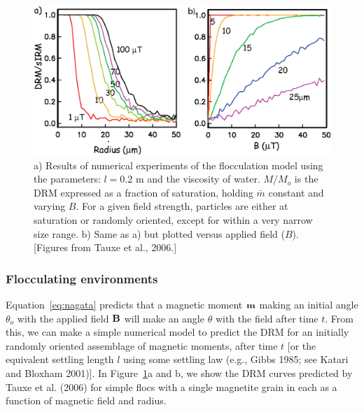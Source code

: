 \begin{figure}[htb]
\centering  \includegraphics[width=13 cm]{EPSfiles/flocs.eps}
\caption{a)  Results of numerical experiments of the flocculation model using the parameters: $l=0.2$ m and the viscosity of water.  $M/M_o$ is the DRM expressed as a fraction of saturation, holding $\bar m$ constant and varying $B$.  For a given field strength, particles are either at saturation or randomly oriented, except for within a very narrow size range.  b) Same as a) but plotted versus applied field ($B$). [Figures  from Tauxe et al., 2006.]   }
\label{fig:flocs}
\end{figure}\nocite{tauxe06}
\subsubsection{Flocculating environments}
\label{sect:flocs}


  Equation~\ref{eq:nagata} predicts that a  magnetic moment $\bf m$ making an initial angle $\theta_o$ with the applied field  $\bf B$  will make an angle $\theta$ with the field after time $t$.  From this, we can make a simple numerical model to predict the DRM for an initially randomly oriented assemblage of magnetic moments, after time $t$ [or the equivalent settling length $l$ using some settling law (e.g.,
   \nocite{gibbs85} 
   Gibbs  1985; see \nocite{katari01}
   Katari and Bloxham 2001)].  In Figure~\ref{fig:flocs}a and b, we show the DRM curves predicted by 
   \nocite{tauxe06}
   Tauxe et al. (2006) for simple flocs with a single magnetite grain in each  as a function of magnetic field and radius. 
  
